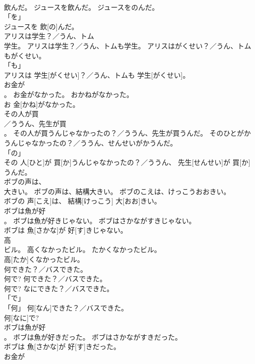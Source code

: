\documentclass[8pt]{extreport}
\begin{document}
\begin{CJK}{UTF8}{min}
\\	飲んだ。	ジュースを飲んだ。	ジュースをのんだ。	
\\	「を」 
\\	ジュースを 飲[の]んだ。		
\\	アリスは学生？／うん、トム
\\	学生。	アリスは学生？／うん、トムも学生。	アリスはがくせい？／うん、トムもがくせい。	
\\	「も」 
\\	アリスは 学生[がくせい]？／うん、トムも 学生[がくせい]。		
\\	お金が
\\	。	お金がなかった。	おかねがなかった。	
\\	お 金[かね]がなかった。		
\\	その人が買
\\	／ううん、先生が買
\\	。	その人が買うんじゃなかったの？／ううん、先生が買うんだ。	そのひとがかうんじゃなかったの？／ううん、せんせいがかうんだ。	
\\	「の」 
\\	その 人[ひと]が 買[か]うんじゃなかったの？／ううん、 先生[せんせい]が 買[か]うんだ。		
\\	ボブの声は、
\\	大きい。	ボブの声は、結構大きい。	ボブのこえは、けっこうおおきい。	
\\	ボブの 声[こえ]は、 結構[けっこう] 大[おお]きい。		
\\	ボブは魚が好
\\	。	ボブは魚が好きじゃない。	ボブはさかながすきじゃない。	
\\	ボブは 魚[さかな]が 好[す]きじゃない。		
\\	高
\\	ビル。	高くなかったビル。	たかくなかったビル。	
\\	高[たか]くなかったビル。		
\\	何できた？／バスできた。
\\	何で?	何できた？／バスできた。
\\	何で?	なにできた？／バスできた。	
\\	「で」 
\\	「何」	何[なん]できた？／バスできた。 
\\	何[なに]で?		
\\	ボブは魚が好
\\	。	ボブは魚が好きだった。	ボブはさかながすきだった。	
\\	ボブは 魚[さかな]が 好[す]きだった。		
\\	お金が

\end{CJK}
\end{document}
